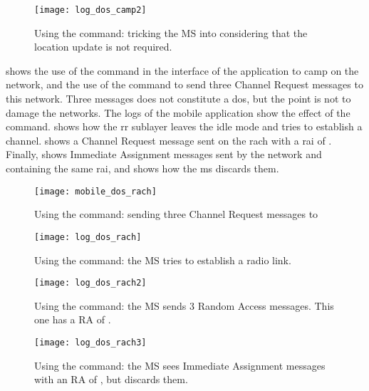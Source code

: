       \begin{figure}[p]
        \centering
        \texttt{[image: log\_dos\_camp2]}
        \caption{Using the  command: tricking the MS into
        considering that the location update is not required.}
        \label{fig:log_dos_camp2}
      \end{figure}

       shows the use of the 
      command in the interface of the  application to camp
      on the  network, and the use of the 
      command to send three Channel Request messages to this network.
      Three messages does not constitute a \gls{dos}, but the point is
      not to damage the networks. The logs of the mobile application
      show the effect of the command.  shows how
      the \gls{rr} sublayer leaves the idle mode and tries to establish
      a channel.  shows a Channel Request
      message sent on the \gls{rach} with a \gls{rai} of .
      Finally,  shows Immediate Assignment
      messages sent by the network and containing the same \gls{rai},
      and shows how the \gls{ms} discards them.

      \begin{figure}[p]
        \centering
        \texttt{[image: mobile\_dos\_rach]}
        \caption{Using the  command: sending three Channel
        Request messages to }
        \label{fig:mobile_dos_rach}
      \end{figure}

      \begin{figure}[p]
        \centering
        \texttt{[image: log\_dos\_rach]}
        \caption{Using the  command: the MS tries to
        establish a radio link.}
        \label{fig:log_dos_rach}
      \end{figure}

      \begin{figure}[p]
        \centering
        \texttt{[image: log\_dos\_rach2]}
        \caption{Using the  command: the MS sends 3
          Random Access messages. This one has a RA of .}
        \label{fig:log_dos_rach2}
      \end{figure}

      \begin{figure}[p]
        \centering
        \texttt{[image: log\_dos\_rach3]}
        \caption{Using the  command: the MS sees
        Immediate Assignment messages with an RA of , but
      discards them.}
        \label{fig:log_dos_rach3}
      \end{figure}

